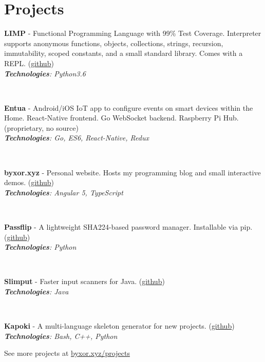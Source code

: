 \documentclass{article}
\begin{document}
\section{Projects}
\vspace{1em}
\begin{multicols}{2}
\parbox{\linewidth}{\textbf{LIMP} - Functional Programming Language with 99\% Test Coverage. Interpreter supports anonymous functions, objects, collections, strings, recursion, immutability, scoped constants, and a small standard library. Comes with a REPL. (\href{http://www.github.com/byxor/limp}{github})\\
\textit{\textbf{Technologies}: Python3.6}}\vspace{1.5em}\\\parbox{\linewidth}{\textbf{Entua} - Android/iOS IoT app to configure events on smart devices within the Home. React-Native frontend. Go WebSocket backend. Raspberry Pi Hub. (proprietary, no source)\\
\textit{\textbf{Technologies}: Go, ES6, React-Native, Redux}}\vspace{1.5em}\\\parbox{\linewidth}{\textbf{byxor.xyz} - Personal website. Hosts my programming blog and small interactive demos. (\href{http://www.github.com/byxor/website}{github})\\
\textit{\textbf{Technologies}: Angular 5, TypeScript}}\vspace{1.5em}\\\parbox{\linewidth}{\textbf{Passflip} - A lightweight SHA224-based password manager. Installable via pip. (\href{http://www.github.com/byxor/passflip}{github})\\
\textit{\textbf{Technologies}: Python}}\vspace{1.5em}\\\parbox{\linewidth}{\textbf{Slimput} - Faster input scanners for Java. (\href{http://www.github.com/byxor/slimput}{github})\\
\textit{\textbf{Technologies}: Java}}\vspace{1.5em}\\\parbox{\linewidth}{\textbf{Kapoki} - A multi-language skeleton generator for new projects. (\href{http://www.github.com/byxor/kapoki}{github})\\
\textit{\textbf{Technologies}: Bash, C++, Python}}
\end{multicols}
\begin{center}
\vspace{1em}
See more projects at \url{byxor.xyz/projects}
\end{center}
\end{document}
